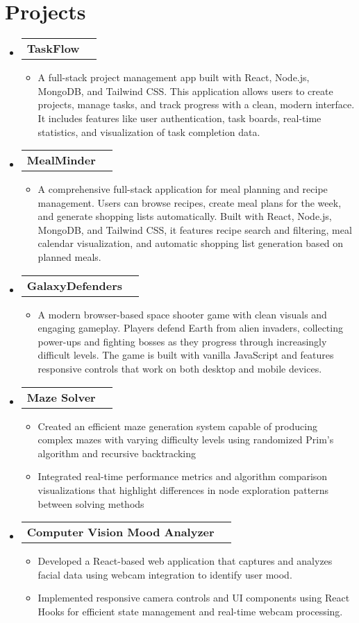 \documentclass[letterpaper,11pt]{article}
\makeatletter
\newcommand{\resumeItem}[1]{
  \item\footnotesize{#1}
    {\vspace{-2pt}}
  }
\newcommand{\resumeProjectHeading}[2]{
    \item
    \begin{tabular*}{0.97\textwidth}{l@{\extracolsep{\fill}}r}
      \footnotesize#1 & \footnotesize#2 \\
    \end{tabular*}\vspace{-7pt}
}
\newcommand{\resumeSubHeadingListStart}{\begin{itemize}[leftmargin=0.15in, label={}]}
\newcommand{\resumeSubHeadingListEnd}{\end{itemize}}
\newcommand{\resumeItemListStart}{\begin{itemize}[leftmargin=*]\vspace{-2pt}}
\newcommand{\resumeItemListEnd}{\end{itemize}\vspace{-5pt}}
\makeatother
\begin{document}
\section{Projects}
    \resumeSubHeadingListStart
      \resumeProjectHeading
          {\textbf{TaskFlow} \emph{}}{}
          \resumeItemListStart
            \resumeItem{A full-stack project management app built with React, Node.js, MongoDB, and Tailwind CSS. This application allows users to create projects, manage tasks, and track progress with a clean, modern interface. It includes features like user authentication, task boards, real-time statistics, and visualization of task completion data.}
          \resumeItemListEnd
      \resumeProjectHeading
          {\textbf{MealMinder} \emph{}}{}
          \resumeItemListStart
            \resumeItem{A comprehensive full-stack application for meal planning and recipe management. Users can browse recipes, create meal plans for the week, and generate shopping lists automatically. Built with React, Node.js, MongoDB, and Tailwind CSS, it features recipe search and filtering, meal calendar visualization, and automatic shopping list generation based on planned meals.}
          \resumeItemListEnd
      \resumeProjectHeading
          {\textbf{GalaxyDefenders} \emph{}}{}
          \resumeItemListStart
            \resumeItem{A modern browser-based space shooter game with clean visuals and engaging gameplay. Players defend Earth from alien invaders, collecting power-ups and fighting bosses as they progress through increasingly difficult levels. The game is built with vanilla JavaScript and features responsive controls that work on both desktop and mobile devices.}
          \resumeItemListEnd
      \resumeProjectHeading
          {\textbf{Maze Solver} \emph{}}{}
          \resumeItemListStart
            \resumeItem{Created an efficient maze generation system capable of producing complex mazes with varying difficulty levels using randomized Prim's algorithm and recursive backtracking}
            \resumeItem{Integrated real-time performance metrics and algorithm comparison visualizations that highlight differences in node exploration patterns between solving methods}
        \resumeItemListEnd
        \resumeProjectHeading
        {\textbf{Computer Vision Mood Analyzer} \emph{}}{}
          \resumeItemListStart
            \resumeItem{Developed a React-based web application that captures and analyzes facial data using webcam integration to identify user mood.}
            \resumeItem{Implemented responsive camera controls and UI components using React Hooks for efficient state management and real-time webcam processing.}
      \resumeItemListEnd
    \resumeSubHeadingListEnd
\end{document}
